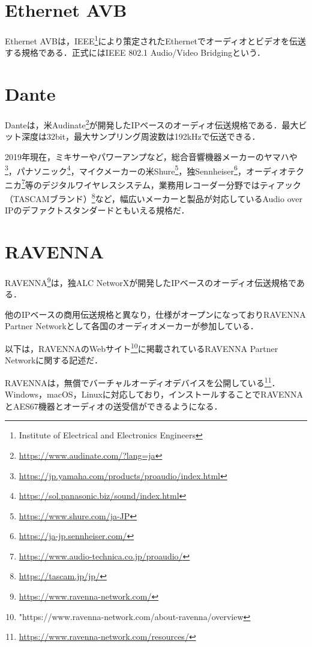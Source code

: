 \section{Ethernet AVB}

Ethernet AVBは，IEEE\footnote{Institute of Electrical and Electronics Engineers}により策定されたEthernetでオーディオとビデオを伝送する規格である．正式にはIEEE 802.1 Audio/Video Bridgingという．

\section{Dante}

Danteは，米Audinate\footnote{\url{https://www.audinate.com/?lang=ja}}が開発したIPベースのオーディオ伝送規格である．最大ビット深度は32bit，最大サンプリング周波数は192kHzで伝送できる\cite{best-practices-in-network-audio}．

2019年現在，ミキサーやパワーアンプなど，総合音響機器メーカーのヤマハや\footnote{\url{https://jp.yamaha.com/products/proaudio/index.html}}，パナソニック\footnote{\url{https://sol.panasonic.biz/sound/index.html}}，マイクメーカーの米Shure\footnote{\url{https://www.shure.com/ja-JP}}，独Sennheiser\footnote{\url{https://ja-jp.sennheiser.com/}}，オーディオテクニカ\footnote{\url{https://www.audio-technica.co.jp/proaudio/}}等のデジタルワイヤレスシステム，業務用レコーダー分野ではティアック（TASCAMブランド）\footnote{\url{https://tascam.jp/jp/}}など，幅広いメーカーと製品が対応しているAudio over IPのデファクトスタンダードともいえる規格だ．

\section{RAVENNA}

RAVENNA\footnote{\url{https://www.ravenna-network.com/}}は，独ALC NetworXが開発したIPベースのオーディオ伝送規格である．

他のIPベースの商用伝送規格と異なり，仕様がオープンになっておりRAVENNA Partner Networkとして各国のオーディオメーカーが参加している．

以下は，RAVENNAのWebサイト\footnote{"https://www.ravenna-network.com/about-ravenna/overview}に掲載されているRAVENNA Partner Networkに関する記述だ．

RAVENNAは，無償でバーチャルオーディオデバイスを公開している\footnote{\url{https://www.ravenna-network.com/resources/}}．Windows，macOS，Linuxに対応しており，インストールすることでRAVENNAとAES67機器とオーディオの送受信ができるようになる．

